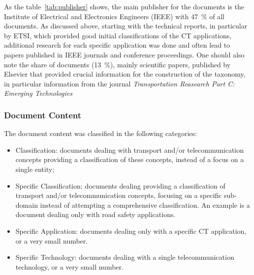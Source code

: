 As the table~\ref{tab:publisher} shows, the main publisher for the documents is the Institute of Electrical and Electronics Engineers (IEEE) with 47~\% of all documents. %
As discussed above, starting with the technical reports, in particular by \acrshort{ETSI}, which provided good initial classifications of the \acrshort{CT} applications, additional research for each specific application was done and often lead to papers published in IEEE journals and conference proceedings. One should also note the share of documents (13~\%), mainly scientific papers, published by Elsevier that provided crucial information for the construction of the taxonomy, in particular information from the journal \emph{Transportation Reasearch Part C: Emerging Technologies}

\subsubsection{Document Content}

The document content was classified in the following categories: 
\begin{itemize}
\item Classification: documents dealing with transport and/or telecommunication concepts providing a classification of these concepts, instead of a focus on a single entity;
\item Specific Classification: documents dealing providing a classification of transport and/or telecommunication concepts, focusing on a specific sub-domain instead of attempting a comprehensive classification. An example is a document dealing only with road safety applications.  
\item Specific Application: documents dealing only with a specific \acrshort{CT} application, or a very small number.
\item Specific Technology: documents dealing with a single telecommunication technology, or a very small number. 
\end{itemize}


